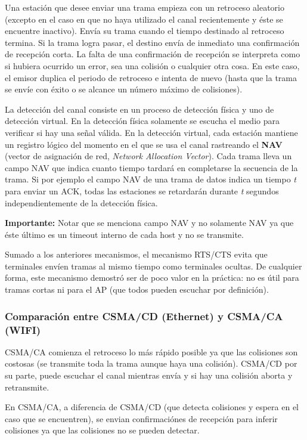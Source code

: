 \documentclass{book}
\begin{document}
	Una estación que desee enviar una trama empieza con un retroceso aleatorio (excepto en el caso en que no haya utilizado el canal recientemente y éste se encuentre inactivo). Envía su trama cuando el tiempo destinado al retroceso termina. Si la trama logra pasar, el destino envía de inmediato una confirmación de recepción corta. La falta de una confirmación de recepción se interpreta como si hubiera ocurrido un error, sea una colisión o cualquier otra cosa. En este caso, el emisor duplica el periodo de retroceso e intenta de nuevo (hasta que la trama se envíe con éxito o se alcance un número máximo de colisiones).
	
	\vspace{3mm}
	La detección del canal consiste en un proceso de detección física y uno de detección virtual. En la detección física solamente se escucha el medio para verificar si hay una señal válida. En la detección virtual, cada estación mantiene un registro lógico del momento en el que se usa el canal rastreando el \textbf{NAV} (vector de asignación de red, \textit{Network Allocation Vector}). Cada trama lleva un campo NAV que indica cuanto tiempo tardará en completarse la secuencia de la trama. Si por ejemplo el campo NAV de una trama de datos indica un tiempo \textit{t} para enviar un ACK, todas las estaciones se retardarán durante \textit{t} segundos independientemente de la detección física.
	
	\textbf{Importante:} Notar que se menciona campo NAV y no solamente NAV ya que éste último es un timeout interno de cada host y no se transmite.
	
	\vspace{3mm}
	Sumado a los anteriores mecanismos, el mecanismo RTS/CTS evita que terminales envíen tramas al mismo tiempo como terminales ocultas. De cualquier forma, este mecanismo demostró ser de poco valor en la práctica: no es útil para tramas cortas ni para el AP (que todos pueden escuchar por definición).
	
	\subsubsection{Comparación entre CSMA/CD (Ethernet) y CSMA/CA (WIFI)}
	CSMA/CA comienza el retroceso lo más rápido posible ya que las colisiones son costosas (se transmite toda la trama aunque haya una colisión). CSMA/CD por su parte, puede escuchar el canal mientras envía y si hay una colisión aborta y retransmite.
	
	\vspace{3mm}
	En CSMA/CA, a diferencia de CSMA/CD (que detecta colisiones y espera en el caso que se encuentren), se envian confirmaciónes de recepción para inferir colisiones ya que las colisiones no se pueden detectar.
	
\end{document}
